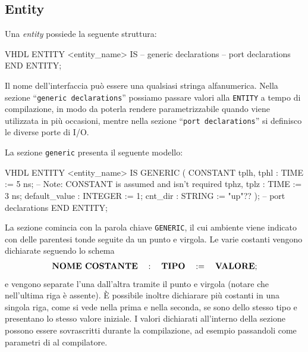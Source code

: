 \documentclass[10pt,a4paper,oneside]{scrbook}
\begin{document}
\subsection{Entity}
Una \textit{entity} possiede la seguente struttura:
\begin{sourcecode}{VHDL}
ENTITY <entity_name> IS
    -- generic declarations
    -- port declarations
END ENTITY;
\end{sourcecode}
Il nome dell'interfaccia può essere una qualsiasi stringa alfanumerica. 
Nella sezione ``\texttt{generic declarations}'' possiamo passare valori 
alla \texttt{ENTITY} a tempo di compilazione, in modo da poterla rendere 
parametrizzabile quando viene utilizzata in più occasioni, mentre nella sezione 
``\texttt{port declarations}'' si definisco le diverse porte di I/O.

La sezione \texttt{generic} presenta il seguente modello:
\begin{sourcecode}{VHDL}
ENTITY <entity_name> IS
    GENERIC (
        CONSTANT tplh, tphl : TIME        := 5 ns;
        -- Note: CONSTANT is assumed and isn't required
        tphz, tplz          : TIME        := 3 ns;
        default_value       : INTEGER     := 1;
        cnt_dir             : STRING      := "up"??
    );
    -- port declarations
END ENTITY;
\end{sourcecode}
La sezione comincia con la parola chiave \texttt{GENERIC}, il cui ambiente 
viene indicato con delle parentesi tonde seguite da un punto e virgola.
Le varie costanti vengono dichiarate seguendo lo schema
\begin{align*}
    \text{\textbf{NOME COSTANTE}} \quad : \quad \text{\textbf{TIPO}} \quad := 
    \quad \text{\textbf{VALORE}};
\end{align*}
e vengono separate l'una dall'altra tramite il punto e virgola (notare che 
nell'ultima riga è assente).
È possibile inoltre dichiarare più costanti in una singola riga, come si vede 
nella prima e nella seconda, se sono dello stesso tipo e presentano lo stesso 
valore iniziale.
I valori dichiarati all'interno della sezione possono essere sovrascritti 
durante la compilazione, ad esempio passandoli come parametri di al compilatore.
\end{document}

